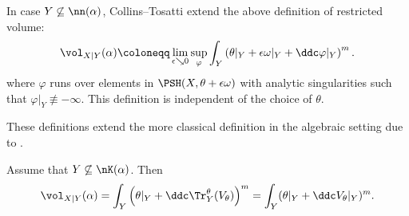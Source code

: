 In case $Y\not\subseteq \nn(\alpha)$, Collins--Tosatti \cite{CT22} extend the above definition of restricted volume:
\begin{equation}\label{eq:rest_vol_CT_def}
        \vol_{X|Y}(\alpha)\coloneqq \lim_{\epsilon \searrow 0}\sup_{\varphi} \int_Y \left(\theta|_Y + \epsilon \omega|_Y +\ddc \varphi|_Y\right)^m.
\end{equation}
where $\varphi$ runs over elements in $\PSH(X,\theta+\epsilon\omega)$ with analytic singularities such that $\varphi|_Y\not\equiv -\infty$. This definition is independent of the choice of $\theta$.

These definitions extend the more classical definition in the algebraic setting due to \cite{ELMNP09}.

\begin{proposition}\label{prop:restvol_voltrace}
Assume that $Y\not\subseteq \nK(\alpha)$. Then
    \begin{equation}\label{eq:volrest}
        \vol_{X|Y}(\alpha)= \int_Y \left( \theta|_Y+\ddc \Tr_Y^{\theta}(V_{\theta}) \right)^m =\int_Y (\theta|_Y + \ddc V_\theta|_Y)^m.
    \end{equation}
\end{proposition}

